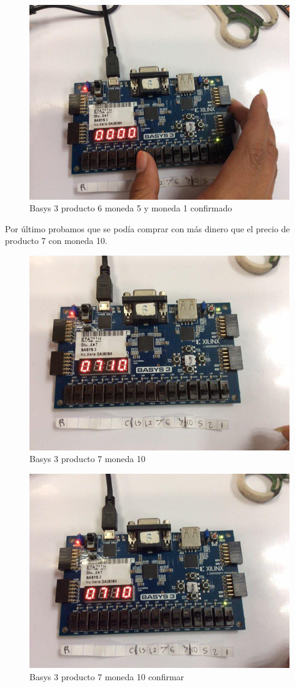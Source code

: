 \documentclass[12pt]{article}  %
\begin{document}
\newpage

\begin{figure}[!ht]
  \centering
  \caption{Basys 3 producto 6 moneda 5 y moneda 1 confirmado}
  \includegraphics[width=0.75\linewidth]{Imagenes/Basys/product6-coin6-change.png}
\end{figure}

Por último probamos que se podía comprar con más dinero que el precio de producto 7 con moneda 10.

\begin{figure}[!ht]
  \centering
  \caption{Basys 3 producto 7 moneda 10}
  \includegraphics[width=0.75\linewidth]{Imagenes/Basys/product7-coin10.png}
\end{figure}

\newpage

\begin{figure}[!ht]
  \centering
  \caption{Basys 3 producto 7 moneda 10 confirmar}
  \includegraphics[width=0.75\linewidth]{Imagenes/Basys/product7-coin10-confirmed.png}
\end{figure}
\end{document}

